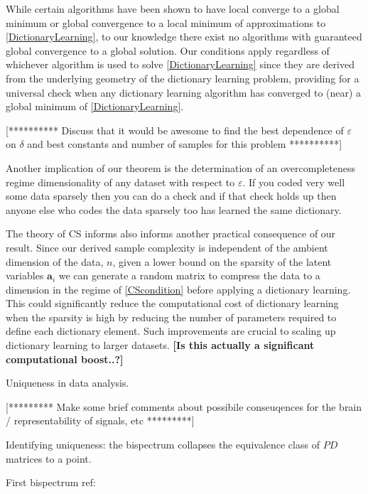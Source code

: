 \documentclass[journal, onecolumn]{IEEEtran}
\begin{document}
While certain algorithms have been shown to have local converge to a global minimum or global convergence to a local minimum of approximations to \eqref{DictionaryLearning}, to our knowledge there exist no algorithms with guaranteed global convergence to a global solution. Our conditions apply regardless of whichever algorithm is used to solve \eqref{DictionaryLearning} since they are derived from the underlying geometry of the dictionary learning problem, providing for a universal check when any dictionary learning algorithm has converged to (near) a global minimum of \eqref{DictionaryLearning}.

[********** Discuss that it would be awesome to find the best dependence of $\varepsilon$ on $\delta$ and best constants and number of samples for this problem **********]


Another implication of our theorem is the determination of an overcompleteness regime dimensionality of any dataset with respect to $\varepsilon$. If you coded very well some data sparsely then you can do a check and if that check holds up then anyone else who codes the data sparsely too has learned the same dictionary. 

The theory of CS informs also informs another practical consequence of our result. Since our derived sample complexity is independent of the ambient dimension of the data, $n$, given a lower bound on the sparsity of the latent variables $\mathbf{a}_i$ we can generate a random matrix to compress the data to a dimension in the regime of \eqref{CScondition} before applying a dictionary learning. This could significantly reduce the computational cost of dictionary learning when the sparsity is high by reducing the number of parameters required to define each dictionary element. Such improvements are crucial to scaling up dictionary learning to larger datasets. \textbf{[Is this actually a significant computational boost..?]}  


Uniqueness in data analysis.

[********* Make some brief comments about possibile conseuqences for the brain / representability of signals, etc *********]

Identifying uniqueness: the bispectrum collapses the equivalence class of $PD$ matrices to a point.


First bispectrum ref:  \cite{tukey1953spectral}
\end{document}
